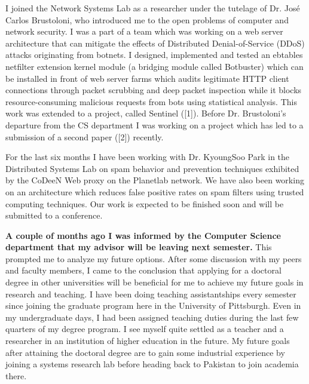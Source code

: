 I joined the Network Systems Lab as a researcher under the tutelage of
Dr. Jos\'e Carlos Brustoloni, who introduced me to the open problems of
computer and network security. I was a part of a team which was working 
on a web server architecture that can mitigate the effects of Distributed 
Denial-of-Service (DDoS) attacks originating from botnets. I designed, 
implemented and tested an ebtables netfilter extension kernel module 
(a bridging module called Botbuster) which can be installed in front 
of web server farms which audits legitimate HTTP client connections 
through packet scrubbing and deep packet inspection while it blocks 
resource-consuming malicious requests from bots using statistical analysis. 
This work was extended to a project, called Sentinel ([1]). Before Dr.
Brustoloni's departure from the CS department I was working on a project
which has led to a submission of a second paper ([2]) recently. 
\vs

For the last six months I have been working with Dr. KyoungSoo Park in the
Distributed Systems Lab on spam behavior and prevention techniques
exhibited by the CoDeeN Web proxy on the Planetlab network. We have also been 
working on an architecture which reduces false positive rates on spam filters 
using trusted computing techniques. Our work is expected to be finished soon and 
will be submitted to a conference.
\vs

{\bf A couple of months ago I was informed by the Computer Science department
that my advisor will be leaving next semester.} This prompted me to
analyze my future options. After some discussion with my peers and
faculty members, I came to the conclusion that applying for a doctoral
degree in other universities will be beneficial for me to achieve my
future goals in research and teaching. I have been doing teaching
assistantships every semester since joining the graduate program here
in the University of Pittsburgh. Even in my undergraduate days, I had
been assigned teaching duties during the last few quarters of my
degree program. I see myself quite settled as a teacher and a
researcher in an institution of higher education in the future. My
future goals after attaining the doctoral degree are to gain some
industrial experience by joining a systems research lab before heading
back to Pakistan to join academia there. 
\vs

